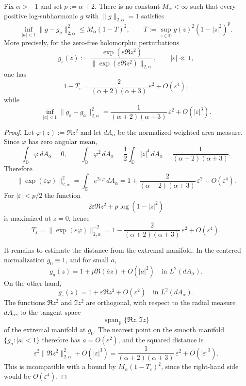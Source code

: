 \documentclass[a4paper,10pt]{amsart}
\newcommand{\D}{\mathbb{D}}
\begin{document}
\begin{numprop}\label{prop:quadratic-diel-fails}
Fix $\alpha>-1$ and set $p:=\alpha+2$. There is no constant $M_\alpha<\infty$
such that every positive log-subharmonic $g$ with $\|g\|_{2,\alpha}=1$ satisfies
\[
\inf_{|a|<1}\|g-g_a\|_{2,\alpha}^2
\le
M_\alpha(1-T)^2,
\qquad
T:=\sup_{z\in\D}g(z)^2(1-|z|^2)^p.
\]
More precisely, for the zero-free holomorphic perturbations
\[
g_\varepsilon(z):=\frac{\exp(\varepsilon\Re z^2)}
{\|\exp(\varepsilon\Re z^2)\|_{2,\alpha}},
\qquad |\varepsilon|\ll1,
\]
one has
\[
1-T_\varepsilon
=
\frac{2}{(\alpha+2)(\alpha+3)}\,\varepsilon^2+O(\varepsilon^4),
\]
while
\[
\inf_{|a|<1}\|g_\varepsilon-g_a\|_{2,\alpha}^2
=
\frac{1}{(\alpha+2)(\alpha+3)}\,\varepsilon^2+O(|\varepsilon|^3).
\]
\end{numprop}

\begin{proof}
Let $\varphi(z):=\Re z^2$ and let $dA_\alpha$ be the normalized weighted area
measure. Since $\varphi$ has zero angular mean,
\[
\int_\D \varphi\,dA_\alpha=0,
\qquad
\int_\D \varphi^2\,dA_\alpha
=\frac12\int_\D |z|^4\,dA_\alpha
=\frac{1}{(\alpha+2)(\alpha+3)}.
\]
Therefore
\[
\|\exp(\varepsilon\varphi)\|_{2,\alpha}^2
=
\int_\D e^{2\varepsilon\varphi}\,dA_\alpha
=
1+
\frac{2}{(\alpha+2)(\alpha+3)}\,\varepsilon^2
+O(\varepsilon^4).
\]
For $|\varepsilon|<p/2$ the function
\[
2\varepsilon\Re z^2+p\log(1-|z|^2)
\]
is maximized at $z=0$, hence
\[
T_\varepsilon
=\|\exp(\varepsilon\varphi)\|_{2,\alpha}^{-2}
=
1-\frac{2}{(\alpha+2)(\alpha+3)}\,\varepsilon^2+O(\varepsilon^4).
\]

It remains to estimate the distance from the extremal manifold. In the centered
normalization $g_0\equiv1$, and for small $a$,
\[
g_a(z)=1+p\Re(\overline a z)+O(|a|^2)
\quad\text{in }L^2(dA_\alpha).
\]
On the other hand,
\[
g_\varepsilon(z)=1+\varepsilon\Re z^2+O(\varepsilon^2)
\quad\text{in }L^2(dA_\alpha).
\]
The functions $\Re z^2$ and $\Im z^2$ are orthogonal, with respect to the radial
measure $dA_\alpha$, to the tangent space
\[
\operatorname{span}_{\mathbb R}\{\Re z,\Im z\}
\]
of the extremal manifold at $g_0$. The nearest point on the smooth manifold
$\{g_a:|a|<1\}$ therefore has $a=O(\varepsilon^2)$, and the squared distance is
\[
\varepsilon^2\|\Re z^2\|_{2,\alpha}^2+O(|\varepsilon|^3)
=
\frac{1}{(\alpha+2)(\alpha+3)}\,\varepsilon^2+O(|\varepsilon|^3).
\]
This is incompatible with a bound by $M_\alpha(1-T_\varepsilon)^2$, since the
right-hand side would be $O(\varepsilon^4)$.
\end{proof}
\end{document}
